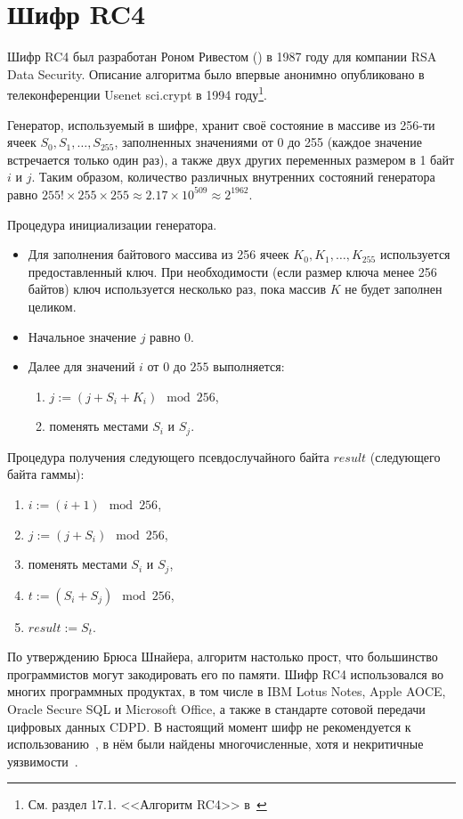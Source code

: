 \section{Шифр RC4}\label{rc4}

Шифр RC4 был разработан Роном Ривестом () в 1987 году для компании RSA Data Security. Описание алгоритма было впервые анонимно опубликовано в телеконференции Usenet sci.crypt в 1994 году\footnote{См. раздел 17.1. <<Алгоритм RC4>> в~\cite{Schneier:2002}}.

Генератор, используемый в шифре, хранит своё состояние в массиве из 256-ти ячеек $S_0, S_1, \dots, S_{255}$, заполненных значениями от 0 до 255 (каждое значение встречается только один раз), а также двух других переменных размером в 1 байт $i$ и $j$. Таким образом, количество различных внутренних состояний генератора равно $255! \times 255 \times 255 \approx 2.17 \times 10^{509} \approx 2^{1962}$.

Процедура инициализации генератора.
\begin{itemize}
	\item Для заполнения байтового массива из 256 ячеек $K_0, K_1, \dots, K_{255}$ используется предоставленный ключ. При необходимости (если размер ключа менее 256 байтов) ключ используется несколько раз, пока массив $K$ не будет заполнен целиком.
	\item Начальное значение $j$ равно $0$.
	\item Далее для значений $i$ от $0$ до $255$ выполняется:
	\begin{enumerate}
		\item $j:= (j + S_i + K_i) \mod 256$,
		\item поменять местами $S_i$ и $S_j$.
	\end{enumerate}
\end{itemize}

Процедура получения следующего псевдослучайного байта $result$ (следующего байта гаммы):
\begin{enumerate}
	\item $ i := (i + 1) \mod 256$,
	\item $ j := (j + S_i) \mod 256$,
	\item поменять местами $S_i$ и $S_j$,
	\item $ t := ( S_i + S_j ) \mod 256$,
	\item $ result := S_t$.
\end{enumerate}

По утверждению Брюса Шнайера, алгоритм настолько прост, что большинство программистов могут закодировать его по памяти. Шифр RC4 использовался во многих программных продуктах, в том числе в IBM Lotus Notes, Apple AOCE, Oracle Secure SQL и Microsoft Office, а также в стандарте сотовой передачи цифровых данных CDPD. В настоящий момент шифр не рекомендуется к использованию~\cite{rfc7465}, в нём были найдены многочисленные, хотя и некритичные уязвимости~\cite{Fluhrer:Mantin:Shamir:2001,Mantin:Shamir:2002,Paul:Maitra:2007,Sepehrdad:Vaudenay:Vuagnoux:2011}.

